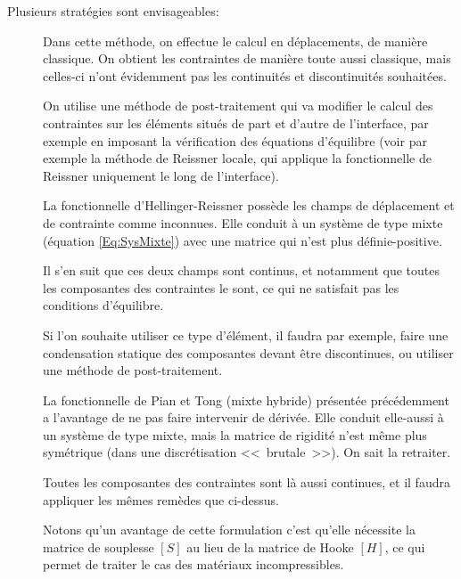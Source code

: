 \bigskip
Plusieurs stratégies sont envisageables:
\begin{description}
\item[]

	Dans cette méthode, on effectue le calcul en déplacements, de manière classique.
	On obtient les contraintes de manière toute aussi classique, mais celles-ci
	n'ont évidemment pas les continuités et discontinuités souhaitées.

	On utilise une méthode de post-traitement qui va modifier le calcul des contraintes
	sur les éléments situés de part et d'autre de l'interface, par exemple
	en imposant la vérification des équations d'équilibre (voir par exemple
	la méthode de Reissner locale, qui applique la fonctionnelle de Reissner uniquement
	le long de l'interface).
\item[]

	La fonctionnelle d'Hellinger-Reissner possède les champs de déplacement et de
	contrainte comme inconnues. Elle conduit à un système de type mixte
	(équation \eqref{Eq:SysMixte}) avec une matrice qui n'est plus définie-positive.

	Il s'en suit que ces deux champs sont continus, et notamment que toutes les
	composantes des contraintes le sont, ce qui ne satisfait pas les conditions
	d'équilibre.

	Si l'on souhaite utiliser ce type d'élément, il faudra par exemple, faire une
	condensation statique des composantes devant être discontinues, ou
	utiliser une méthode de post-traitement.
\item[]

	La fonctionnelle de Pian et Tong (mixte hybride)
	présentée précédemment
	a l'avantage de ne pas faire intervenir de dérivée. Elle conduit elle-aussi
	à un système de type mixte, mais la matrice de rigidité n'est même
	plus symétrique (dans une discrétisation <<~brutale~>>). On sait la retraiter.

	Toutes les composantes des contraintes sont là aussi continues, et il faudra appliquer les
	mêmes remèdes que ci-dessus.

	Notons qu'un avantage de cette formulation c'est qu'elle nécessite la matrice
	de souplesse $[S]$ au lieu de la matrice de Hooke $[H]$, ce qui permet de
	traiter le cas des matériaux incompressibles.
\item[]
	

\end{description}
